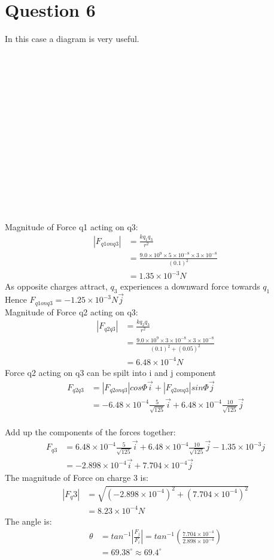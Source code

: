 \documentclass[10pt]{article}
\begin{document}
\section{Question 6}
In this case a diagram is very useful.
\\ \\ \\ \\ \\ \\ \\ \\ \\ \\ \\ \\ \\ \\ \\ \\
Magnitude of Force q1 acting on q3:
\begin{align*}
|F_{q1 on q3}|&=\frac{kq_1q_3}{r^2} \\
&=\frac{9.0\times 10^9 \times 5 \times 10^{-8} \times 3\times 10^{-8}}{(0.1)^2} \\
&=1.35 \times 10^{-3} N
\end{align*}
As opposite charges attract, $q_3$ experiences a downward force towards $q_1$ \\
Hence $F_{q1 on q3}=-1.25 \times 10^{-3} N \vec{j} $ \\

Magnitude of Force q2 acting on q3:
\begin{align*}
|F_{q2q3}|&=\frac{kq_2q_3}{r^2} \\
&=\frac{9.0\times 10^9 \times 3 \times 10^{-8} \times 3\times 10^{-8}}{(0.1)^2+(0.05)^2} \\
&=6.48 \times 10^{-4} N
\end{align*}
Force q2 acting on q3 can be spilt into i and j component
\begin{align*}
F_{q2q3}&=|F_{q2 on q3}| cos \Phi \vec{i}+ |F_{q2 on q3}| sin \Phi \vec{j} \\
&=- 6.48 \times 10^{-4} \frac{5}{\sqrt{125}} \vec{i}+ 6.48 \times 10^{-4}  \frac{10}{\sqrt{125}} \vec{j}
\end{align*} \\
Add up the components of the forces together:
\begin{align*}
F_{q3}&= 6.48 \times 10^{-4} \frac{5}{\sqrt{125}} \vec{i}+ 6.48 \times 10^{-4}  \frac{10}{\sqrt{125}} \vec{j} - 1.35 \times 10^{-3} j \\
&=-2.898\times 10^{-4} \vec{i}+ 7.704 \times 10^{-4} \vec{j}
\end{align*}
The magnitude of Force on charge 3 is:
\begin{align*}
|F_q3|&=\sqrt{(-2.898\times 10^{-4})^2+ (7.704 \times 10^{-4})^2} \\
&=8.23\times 10^{-4} N
\end{align*}
The angle is:
\begin{align*}
\theta &= tan^{-1} \left|\frac{F_j}{F_i} \right|
        =tan^{-1} \left(\frac{7.704 \times 10^{-4}}{2.898\times 10^{-4}} \right) \\
       &=69.38^{\circ} \approx 69.4^{\circ}
\end{align*}
\end{document}
